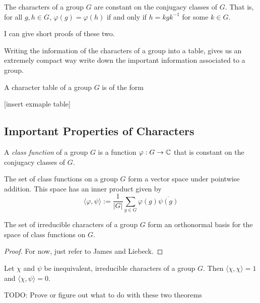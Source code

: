 \begin{theorem}
    The characters of a group $G$ are constant on the conjugacy classes of $G$. That is, for all $g,h \in G$, 
    $\varphi(g) = \varphi(h)$ if and only if $h = kgk^{-1}$ for some $k \in G$.
\end{theorem}

I can give short proofs of these two.

    Writing the information of the characters of a group into a table, gives us an extremely compact way write down 
    the important information associated to a group.
    

\begin{definition}
    A character table of a group $G$ is of the form 
    

    [insert exmaple table]
\end{definition}



\subsection{Important Properties of Characters}

\begin{definition}
    A \emph{class function} of a group $G$ is a function $\varphi : G \rightarrow \mathbb{C}$ that is constant on the 
    conjugacy classes of $G$.
    
    The set of class functions on a group $G$ form a vector space under pointwise addition. This space has an inner 
    product given by
    \[
        \langle \varphi, \psi \rangle := \frac{1}{|G|} \sum_{g \in G} \varphi(g)\overline{\psi(g)}
    \]
\end{definition}


\begin{theorem}
    The set of irreducible characters of a group $G$ form an orthonormal basis for the space of class functions on 
    $G$.
\end{theorem}


\begin{proof}
    For now, just refer to James and Liebeck.
\end{proof}


\begin{theorem}
    Let $\chi$ and $\psi$ be inequivalent, irreducible characters of a group $G$.
    Then $\langle \chi, \chi \rangle = 1$ and $\langle \chi, \psi \rangle = 0$. 
\end{theorem}
TODO: Prove or figure out what to do with these two theorems

